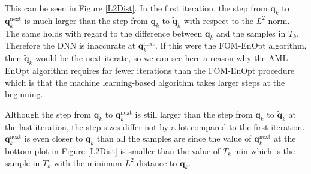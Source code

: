 This can be seen in Figure \ref{L2Dist}. In the first iteration, the step from $\mathbf{q}_k$ to $\mathbf{q}^\mathrm{next}_k$ is much larger than the step from $\mathbf{q}_k$ to $\tilde{\mathbf{q}}_k$ with respect to the $L^2$-norm. The same holds with regard to the difference between $\mathbf{q}_k$ and the samples in $T_k$. Therefore the DNN is inaccurate at $\mathbf{q}^\mathrm{next}_k$. If this were the FOM-EnOpt algorithm, then $\tilde{\mathbf{q}}_k$ would be the next iterate, so we can see here a reason why the AML-EnOpt algorithm requires far fewer iterations than the FOM-EnOpt procedure which is that the machine learning-based algorithm takes larger steps at the beginning.

Although the step from $\mathbf{q}_k$ to $\mathbf{q}^\mathrm{next}_k$ is still larger than the step from $\mathbf{q}_k$ to $\tilde{\mathbf{q}}_k$ at the last iteration, the step sizes differ not by a lot compared to the first iteration. $\mathbf{q}^\mathrm{next}_k$ is even closer to $\mathbf{q}_k$ than all the samples are since the value of $\mathbf{q}^\mathrm{next}_k$ at the bottom plot in Figure \ref{L2Dist} is smaller than the value of $T_k$ min which is the sample in $T_k$ with the minimum $L^2$-distance to $\mathbf{q}_k$.\\

